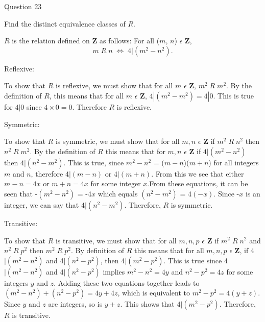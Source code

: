 \documentclass{article}
\begin{document}
\clearpage
{} Question 23
\item[]Find the distinct equivalence classes of $R$.
\item[] $R$ is the relation defined on \textbf{Z} as follows: For all ($m$, $n$) $\epsilon$ \textbf{Z},
$$
m \; R \; n \; \Leftrightarrow \; 4|(m^{2} - n^{2}). 
$$
\item[] Reflexive:
\item[] To show that $R$ is reflexive, we must show that for all $m$ $\epsilon$ $\textbf{Z}$, $m^{2} \; R \; m^{2}$. By the definition of $R$, this means that for all $m$ $\epsilon$ $\textbf{Z}$, $4|(m^{2} - m^{2}) = 4|0.$ This is true for $4|0$ since $4 \times 0  = 0$. Therefore $R$ is reflexive.
\item[] Symmetric:
\item[] To show that $R$ is symmetric, we must show that for all $m, n$ $\epsilon$ $\textbf{Z}$ if $m^{2} \; R \; n^{2}$ then $n^{2} \; R \; m^{2}$. By the definition of $R$ this means that for  $m, n$ $\epsilon$ $\textbf{Z}$ if $4|(m^{2} - n^{2})$ then $4|(n^{2} - m^{2})$. This is true, since $m^{2} - n^{2}$ = ($m - n$)($m + n$) for all integers $m$ and $n$, therefore 4$|(m - n)$ or 4$|(m + n)$. From this we see that either $m - n = 4x$ or $m + n = 4x$ for some integer $x$.From these equations, it can be seen that -$(m^{2} - n^{2})$ = -4$x$ which equals $(n^{2} - m^{2})$ = 4$(-x)$. Since -$x$ is an integer, we can say that 4$|(n^{2} - m^{2})$. Therefore, $R$ is symmetric.
\item[] Transitive:
\item[] To show that $R$ is transitive, we must show that for all $m, n, p$ $\epsilon$ $\textbf{Z}$ if $m^{2} \; R \; n^{2}$ and $n^{2} \; R \; p^{2}$ then $m^{2} \; R \; p^{2}$. By definition of $R$ this means that for all $m, n, p$ $\epsilon$ $\textbf{Z}$, if 4$|(m^{2} - n^{2})$ and 4$|(n^{2} - p^{2})$, then 4$|(m^{2} - p^{2})$. This is true since 4$|(m^{2} - n^{2})$ and 4$|(n^{2} - p^{2})$ implies $m^{2} - n^{2} = 4y$ and $n^{2} - p^{2} = 4z$ for some integers $y$ and $z$. Adding these two equations together leads to $(m^{2} - n^{2}) + (n^{2} - p^{2}) = 4y + 4z$, which is equivalent to $m^{2} - p^{2} = 4(y+z)$. Since $y$ and $z$ are integers, so is $y + z$. This shows that 4$|(m^{2} - p^{2})$. Therefore, $R$ is transitive. 
\end{document}
